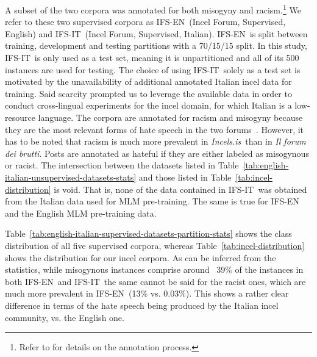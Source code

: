 \documentclass[11pt]{article}
\newcommand{\paolo}[1]{{\color{red} #1}}
\newcommand{\todoA}[1]{\todo[color=blue!40]{A: #1}}
\newcommand{\dsENclassification}{IFS-EN}
\newcommand{\dsITclassification}{IFS-IT}
\newcommand{\enforum}{\textit{Incels.is}}
\newcommand{\itforum}{\textit{Il forum dei brutti}}
\begin{document}
A subset of the two corpora was annotated for both misogyny and racism.\footnote{\paolo{Refer to  for details on the annotation process.}}
We refer to these two supervised corpora as \dsENclassification\, (Incel Forum, Supervised, English) and \dsITclassification\, (Incel Forum, Supervised, Italian). \dsENclassification~is split between training, development and testing partitions with a 70/15/15 split. In this study, \dsITclassification~is only used as a test set, meaning it is unpartitioned and all of its 500 instances are used for testing. \paolo{The choice of using \dsITclassification\, solely as a test set is motivated by the unavailability of additional annotated Italian incel data for training. Said scarcity prompted us to leverage the available data in order to conduct cross-lingual experiments for the incel domain, for which Italian is a low-resource language.}
The corpora are annotated for racism and misogyny because they are the most relevant forms of hate speech in the two forums~\cite{silva2016analyzing,ging2018special}. However, it has to be noted that racism is much more prevalent in \enforum\, than in \itforum. Posts are annotated as hateful if they are either labeled as misogynous or racist.
The intersection between \paolo{the datasets listed in Table~\ref{tab:english-italian-unsupervised-datasets-stats} and those listed in Table~\ref{tab:incel-distribution} is void. That is, none of the data contained in \dsITclassification\, was obtained from the Italian data used for MLM pre-training. The same is true for \dsENclassification\, and the English MLM pre-training data.}

Table~\ref{tab:english-italian-supervised-datasets-partition-stats} shows the class distribution of all five supervised corpora, whereas Table~\ref{tab:incel-distribution} shows the distribution for our incel corpora. \paolo{As can be inferred from the statistics, while misogynous instances comprise around ~39\% of the instances in both \dsENclassification\, and \dsITclassification\, the same cannot be said for the racist ones, which are much more prevalent in \dsENclassification\, (13\% vs. 0.03\%). This shows a rather clear difference in terms of the hate speech being produced by the Italian incel community, vs. the English one.}
\end{document}
